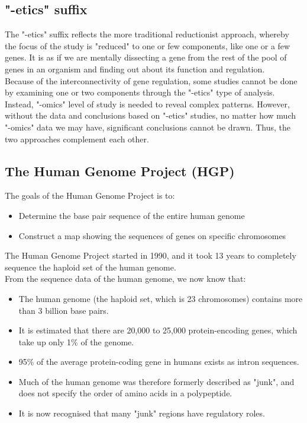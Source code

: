 \documentclass[11pt]{article}
\begin{document}
\newpage

\subsection{"-etics" suffix}
\label{sec:org8172aac}
The "-etics" suffix reflects the more traditional reductionist approach, whereby the focus of the study is "reduced" to one or few components, like one or a few genes. It is as if we are mentally dissecting a gene from the rest of the pool of genes in an organism and finding out about its function and regulation.
\\[0pt]

Because of the interconnectivity of gene regulation, some studies cannot be done by examining one or two components through the "-etics" type of analysis. Instead, "-omics" level of study is needed to reveal complex patterns. However, without the data and conclusions based on "-etics" studies, no matter how much "-omics" data we may have, significant conclusions cannot be drawn. Thus, the two approaches complement each other.

\newpage

\subsection{The Human Genome Project (HGP)}
\label{sec:org866cc56}
The goals of the Human Genome Project is to:
\begin{itemize}
\item Determine the base pair sequence of the entire human genome
\item Construct a map showing the sequences of genes on specific chromosomes
\end{itemize}

The Human Genome Project started in 1990, and it took 13 years to completely sequence the haploid set of the human genome.
\\[0pt]

From the sequence data of the human genome, we now know that:
\begin{itemize}
\item The human genome (the haploid set, which is 23 chromosomes) contains more than 3 billion base pairs.
\item It is estimated that there are 20,000 to 25,000 protein-encoding genes, which take up only 1\% of the genome.
\item 95\% of the average protein-coding gene in humans exists as intron sequences.
\item Much of the human genome was therefore formerly described as "junk", and does not specify the order of amino acids in a polypeptide.
\item It is now recognised that many "junk" regions have regulatory roles.
\end{itemize}
\end{document}
